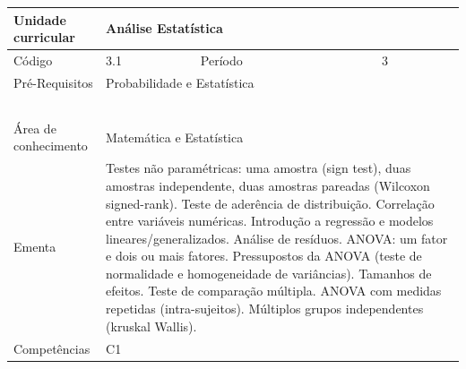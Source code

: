 \clearpage
\newpage

\begin{quadro}[ht!]
  \centering\scriptsize
\caption{Unidade Curricular Análise Estatística}

\begin{tabular}{|p{2.5cm}|p{2.5cm}|p{2.5cm}|p{2.5cm}|p{2.5cm}|}\hline

  Unidade curricular & \multicolumn{4}{p{10cm}|}{ Análise Estatística }\\\hline
  Código & 3.1 & Período & \multicolumn{2}{p{5cm}|}{ 3 }\\\hline
  Pré-Requisitos & \multicolumn{4}{p{10cm}|}{ Probabilidade e Estatística } \\\hline
  \cellcolor{blue1}{ CH PRESENCIAL } &
    \cellcolor{blue1}{CH EAD Síncrona} &
    \cellcolor{blue1}{CH EAD Síncrona Mediada} &
    \cellcolor{blue1}{CH EAD Assíncrona} &
    \cellcolor{blue1}{CH APCC} \\\hline
  \cellcolor{blue1}{ 60 } &
    \cellcolor{blue1}{ 0 } &
    \cellcolor{blue1}{ 0 } &
    \cellcolor{blue1}{ 0 } &
    \cellcolor{blue1}{0} \\\hline
  \cellcolor{blue1}{ CH Teórica } &
    \cellcolor{blue1}{CH Prática} &
    \cellcolor{blue1}{CH Humanidades} &
    \cellcolor{blue1}{CH Extensão} &
    \cellcolor{blue1}{CH EAD TOTAL} \\\hline
  \cellcolor{blue1}{ 30 } &
    \cellcolor{blue1}{ 30 } &
    \cellcolor{blue1}{ 0 } &
    \cellcolor{blue1}{ 0 } &
    \cellcolor{blue1}{ 0 } \\\hline
  \cellcolor{blue1}{CARGA-HORÁRIA TOTAL} & \multicolumn{4}{p{10cm}|}{ \cellcolor{blue1}{ 60 } } \\\hline
  Área de conhecimento & \multicolumn{4}{p{10cm}|}{ Matemática e Estatística } \\\hline
  Ementa & \multicolumn{4}{p{10cm}|}{ Testes não paramétricas: uma amostra (sign test), duas amostras independente, duas amostras pareadas (Wilcoxon signed-rank). Teste de aderência de distribuição. Correlação entre variáveis numéricas. Introdução a regressão e modelos lineares/generalizados. Análise de resíduos. ANOVA: um fator e dois ou mais fatores. Pressupostos da ANOVA (teste de normalidade e homogeneidade de variâncias). Tamanhos de efeitos. Teste de comparação múltipla. ANOVA com medidas repetidas (intra-sujeitos).  Múltiplos grupos independentes (kruskal Wallis). } \\\hline
  Competências & \multicolumn{4}{p{10cm}|}{ C1 } \\\hline


  
	\end{tabular}

\end{quadro}



